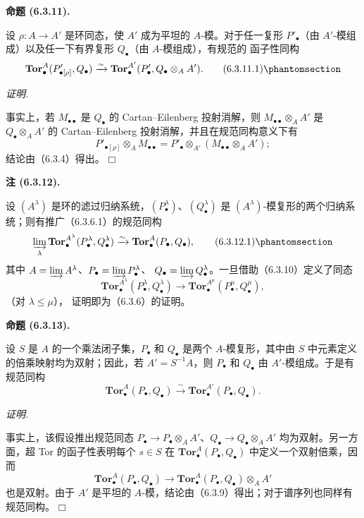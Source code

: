 \documentclass[UTF8,fontset=none,11pt,oneside,openany]{ctexbook}
\providecommand{\square}{\mdlgwhtsquare}
\newenvironment{proposition}[1][]{%
  \par\medskip\noindent\textbf{命题 (#1).}\ %
}{\par}
\newenvironment{proof}{%
  \par\smallskip\noindent\textit{证明.}\ %
}{\hfill$\square$\par}
\newcommand{\oldpage}[2][]{%
  \hypertarget{ega-source-page-#1-#2}{}%
  \marginnote{\scriptsize\textbf{#1}~|~#2}\ignorespaces}
\let\EGAOriginalLabel\label
\renewcommand{\label}[1]{\phantomsection\EGAOriginalLabel{#1}}
\newenvironment{namedtheorem}[2][]{%
  \par\medskip\noindent\textbf{#2 (#1).}\ %
}{\par}
\begin{document}
\begin{proposition}[6.3.11]
设 $\rho:A\to A'$ 是环同态，使 $A'$ 成为平坦的 $A$-模。对于任一复形
$P'_\bullet$（由 $A'$-模组成）以及任一下有界复形 $Q_\bullet$（由 $A$-模组成），有规范的
函子性同构
\[
  \mathbf{Tor}_\bullet^A(P'_{\bullet[\rho]},Q_\bullet)
  \xrightarrow{\sim}
  \mathbf{Tor}_\bullet^{A'}(P'_\bullet,Q_\bullet\otimes_A A').
  \tag{6.3.11.1}\label{III.6.3.11.1-fr}
\]
\end{proposition}

\begin{proof}
事实上，若 $M_{\bullet\bullet}$ 是 $Q_\bullet$ 的 Cartan--Eilenberg
投射消解，则 $M_{\bullet\bullet}\otimes_A A'$ 是
$Q_\bullet\otimes_A A'$ 的 Cartan--Eilenberg 投射消解，并且在规范同构意义下有
\[
  P'_{\bullet[\rho]}\otimes_A M_{\bullet\bullet}
  =P'_\bullet\otimes_{A'}(M_{\bullet\bullet}\otimes_A A');
\]
结论由（6.3.4）得出。
\end{proof}

\begin{namedtheorem}[6.3.12]{注}
设 $(A^\lambda)$ 是环的滤过归纳系统，$(P_\bullet^\lambda)$、$(Q_\bullet^\lambda)$
是 $(A^\lambda)$-模复形的两个归纳系统；则有推广（6.3.6.1）的规范同构
\[
  \varinjlim_\lambda
  \mathbf{Tor}_\bullet^{A^\lambda}
  (P_\bullet^\lambda,Q_\bullet^\lambda)
  \xrightarrow{\sim}
  \mathbf{Tor}_\bullet^A(P_\bullet,Q_\bullet),
  \tag{6.3.12.1}\label{III.6.3.12.1-fr}
\]
其中 $A=\varinjlim A^\lambda$、$P_\bullet=\varinjlim P_\bullet^\lambda$、
$Q_\bullet=\varinjlim Q_\bullet^\lambda$。一旦借助（6.3.10）定义了同态
\[
  \mathbf{Tor}_\bullet^{A^\lambda}
  (P_\bullet^\lambda,Q_\bullet^\lambda)
  \longrightarrow
  \mathbf{Tor}_\bullet^{A^\mu}
  (P_\bullet^\mu,Q_\bullet^\mu),
\]
（对 $\lambda\leqslant\mu$），
证明即为（6.3.6）的证明。
\end{namedtheorem}

\begin{proposition}[6.3.13]
设 $S$ 是 $A$ 的一个乘法闭子集，$P_\bullet$ 和 $Q_\bullet$ 是两个
$A$-模复形，其中由 $S$ 中元素定义的倍乘映射均为双射；因此，若
$A'=S^{-1}A$，则 $P_\bullet$ 和 $Q_\bullet$ 由 $A'$-模组成。于是有规范同构
\[
  \mathbf{Tor}_\bullet^A(P_\bullet,Q_\bullet)
  \xrightarrow{\sim}
  \mathbf{Tor}_\bullet^{A'}(P_\bullet,Q_\bullet).
\]
\end{proposition}

\begin{proof}
事实上，该假设推出规范同态
$P_\bullet\to P_\bullet\otimes_A A'$、$Q_\bullet\to Q_\bullet\otimes_A A'$
均为双射。另一方面，超 Tor 的函子性表明每个 $s\in S$ 在
$\mathbf{Tor}_\bullet^A(P_\bullet,Q_\bullet)$ 中定义一个双射倍乘，因而
\[
  \mathbf{Tor}_\bullet^A(P_\bullet,Q_\bullet)
  \longrightarrow
  \mathbf{Tor}_\bullet^A(P_\bullet,Q_\bullet)\otimes_A A'
\]
\oldpage[III]{146}
也是双射。由于 $A'$ 是平坦的 $A$-模，结论由（6.3.9）得出；对于谱序列也同样有
规范同构。
\end{proof}
\end{document}
